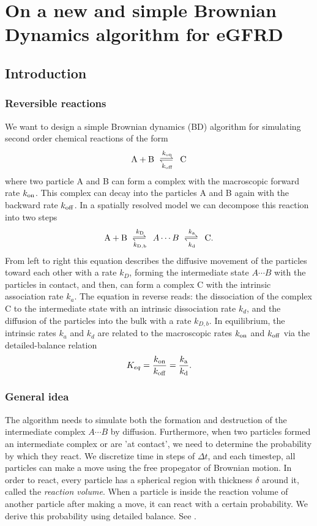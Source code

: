 \section{On a new and simple Brownian Dynamics algorithm for eGFRD}

\subsection{Introduction}

\subsubsection{Reversible reactions}
We want to design a simple Brownian dynamics (BD) algorithm for simulating second order chemical reactions of the form
\begin{equation}
{\rm A} + {\rm B} \rates{k_{\rm on}}{k_{\rm off}} {\rm C}
\end{equation}
where two particle A and B can form a complex with the macroscopic forward rate $k_{\rm on}$. This complex can decay into the particles A and B again with the backward rate $k_{\rm off}$. In a spatially resolved model we can decompose this reaction into two steps \cite{Agmon1990}
\begin{equation}
{\rm A} + {\rm B} \rates{k_{\rm D}}{k_{\rm D,b}} A \cdots B \rates{k_{\rm a}}{k_{\rm d}} {\rm C}.
\end{equation}
From left to right this equation describes the diffusive movement of the particles toward each other with a rate $k_D$, forming the intermediate state $A \cdots B$ with the particles in contact, and then, can form a complex C with the intrinsic association rate $k_a$. The equation in reverse reads: the dissociation of the complex C to the intermediate state with an intrinsic dissociation rate $k_d$, and the diffusion of the particles into the bulk with a rate $k_{D,b}$. In equilibrium, the intrinsic rates $k_a$ and $k_d$ are related to the macroscopic rates $k_{\rm on}$ and $k_{\rm off}$ via the detailed-balance relation
\begin{equation}
K_{eq} = \frac{k_{\rm on}}{k_{\rm off}} = \frac{k_{\rm a}}{k_{\rm d}}.
\end{equation}

\subsubsection{General idea}
The algorithm needs to simulate both the formation and destruction of the intermediate complex $A\cdots B$ by diffusion. Furthermore, when two particles formed an intermediate complex or are 'at contact', we need to determine the probability by which they react. We discretize time in steps of $\Delta t$, and each timestep, all particles can make a move using the free propegator of Brownian motion. In order to react, every particle has a spherical region with thickness $\delta$ around it, called the \emph{reaction volume}. When a particle is inside the reaction volume of another particle after making a move, it can react with a certain probability. We derive this probability using detailed balance. See .

